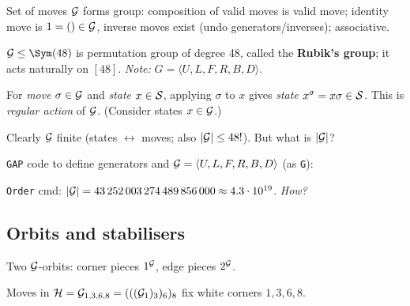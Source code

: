 \begin{slide}
    Set of moves $\mathcal{G}$ forms group: composition of valid moves \pause is valid move; identity move is \pause $1 = () \in \mathcal{G}$, inverse moves \pause exist (undo generators/inverses); associative. \pause

    \begin{definition}
        \vspace{0pt}
        $\RC \leq \Sym(48)$ is permutation group of degree 48, called the \textbf{Rubik's group}; it acts naturally on $[48]$. \pause \textit{Note:} $G = \langle U,L,F,R,B,D \rangle$.
    \end{definition} \pause

    For \textit{move} $\sigma \in \mathcal{G}$ and \textit{state} $x \in \mathcal{S}$, applying $\sigma$ to $x$ gives \textit{state} $x^\sigma = x\sigma \in \mathcal{S}$. This is \textit{regular action} of $\mathcal{G}$. (Consider states $x \in \mathcal{G}$.) \pause

    Clearly $\mathcal{G}$ finite (states $\leftrightarrow$ moves; also $|\mathcal{G}| \leq 48!$). But what is $|\mathcal{G}|$?
\end{slide}

\begin{slide}
    \texttt{GAP} code to define generators and $\mathcal{G} = \langle U,L,F,R,B,D \rangle$ (as \texttt{G}):

    {\footnotesize} \pause

    \texttt{Order} cmd: $|\mathcal{G}| = 43\,252\,003\,274\,489\,856\,000 \approx 4.3 \cdot 10^{19}$. \textit{How?}
\end{slide}

\subsection{Orbits and stabilisers}

\begin{slide}
    \begin{overprint}
        \begin{center}
        \end{center}

        \scriptsize

        \normalsize Two $\mathcal{G}$-orbits: corner pieces $1^{\mathcal{G}}$, edge pieces $2^{\mathcal{G}}$.

        Moves in $\mathcal{H} = \mathcal{G}_{1,3,6,8} = (((\mathcal{G}_1)_3)_6)_8$ fix white corners $1,3,6,8$.

    \end{overprint}
\end{slide}

